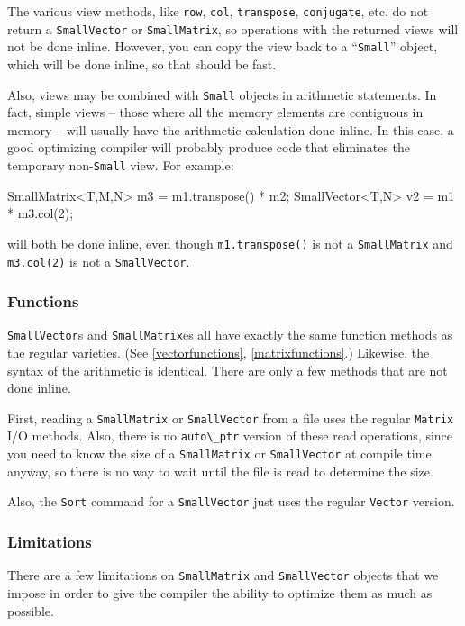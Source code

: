 \documentclass[twoside,letterpaper,11pt]{article}
\renewcommand{\tt}[1]{{\lstinline {#1}}}
\begin{document}
The various view methods, like \tt{row}, \tt{col}, \tt{transpose}, \tt{conjugate}, etc. 
do not return a \tt{SmallVector} or \tt{SmallMatrix}, so operations 
with the returned views will not be done inline.
However, you can copy the view back to a ``\tt{Small}'' object, which will be done 
inline, so that should be fast.

Also, views may be combined with \tt{Small} objects in arithmetic statements.
In fact, simple views -- those where all the memory 
elements are contiguous in memory -- will usually have the arithmetic calculation
done inline.
In this case, a good optimizing compiler will probably produce code that 
eliminates the temporary
non-\tt{Small} view.  For example:
\begin{tmvcode}
SmallMatrix<T,M,N> m3 = m1.transpose() * m2;
SmallVector<T,N> v2 = m1 * m3.col(2);
\end{tmvcode}
will both be done inline, even though \tt{m1.transpose()} is not a \tt{SmallMatrix} and
\tt{m3.col(2)} is not a \tt{SmallVector}.

\subsubsection{Functions}

\tt{SmallVector}s and \tt{SmallMatrix}es all have exactly the same
function methods as the regular varieties.  
(See \ref{vectorfunctions}, \ref{matrixfunctions}.)
Likewise, the syntax of the
arithmetic is identical.  There are only a few methods that 
are not done inline.  

First, reading a \tt{SmallMatrix} or \tt{SmallVector} from a file 
uses the regular
\tt{Matrix} I/O methods.  Also, there is no \tt{auto\_ptr} 
version of these read operations, since you need to know the 
size of a \tt{SmallMatrix} or \tt{SmallVector} at compile time anyway, 
so there is no way to wait until the file is read to determine the size.

Also, the \tt{Sort} command for a \tt{SmallVector} just uses the
regular \tt{Vector} version.

\subsubsection{Limitations}
\label{smallmatrixlimitations}

There are a few limitations on \tt{SmallMatrix} and \tt{SmallVector} objects
that we impose in order to give the compiler the ability to
optimize them as much as possible.
\end{document}
